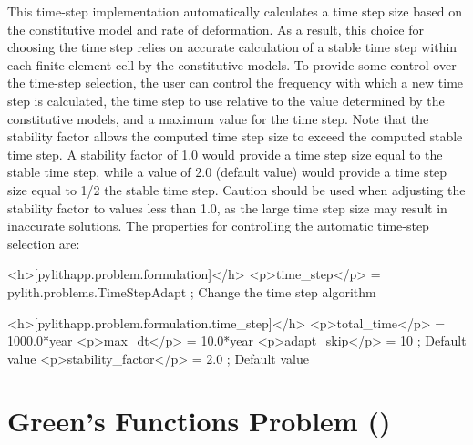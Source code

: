 This time-step implementation automatically calculates a time step
size based on the constitutive model and rate of deformation. As a
result, this choice for choosing the time step relies on accurate
calculation of a stable time step within each finite-element cell
by the constitutive models. To provide some control over the time-step
selection, the user can control the frequency with which a new time
step is calculated, the time step to use relative to the value determined
by the constitutive models, and a maximum value for the time step.
Note that the stability factor allows the computed time step size
to exceed the computed stable time step. A stability factor of 1.0
would provide a time step size equal to the stable time step, while
a value of 2.0 (default value) would provide a time step size equal
to 1/2 the stable time step. Caution should be used when adjusting
the stability factor to values less than 1.0, as the large time step
size may result in inaccurate solutions. The properties for controlling
the automatic time-step selection are:
\begin{inventory}
\end{inventory}

\begin{cfg}
<h>[pylithapp.problem.formulation]</h>
<p>time_step</p> = pylith.problems.TimeStepAdapt ; Change the time step algorithm

<h>[pylithapp.problem.formulation.time_step]</h>
<p>total_time</p> = 1000.0*year
<p>max_dt</p> = 10.0*year
<p>adapt_skip</p> = 10 ; Default value
<p>stability_factor</p> = 2.0 ; Default value
\end{cfg}

\section{Green's Functions Problem ()}

